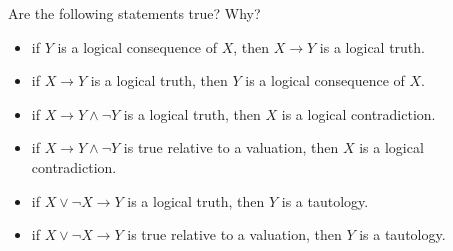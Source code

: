 \begin{practiceproblems}
\noindent\problempart
\label{pr.TT.meta}
Are the following statements true? Why?
\begin{itemize}
\item if $Y$ is a logical consequence of $X$, then $X\rightarrow Y$ is a logical truth.
\item if $X\rightarrow Y$ is a logical truth, then $Y$ is a logical consequence of $X$.
\item if $X\rightarrow Y\wedge\neg Y$ is a logical truth, then $X$ is a logical contradiction.
\item if $X\rightarrow Y\wedge\neg Y$ is true relative to a valuation, then $X$ is a logical contradiction.
\item if $X\vee\neg X\rightarrow Y$ is a logical truth, then $Y$ is a tautology.
\item if $X\vee\neg X\rightarrow Y$ is true relative to a valuation, then $Y$ is a tautology.
\end{itemize}
\end{practiceproblems}




